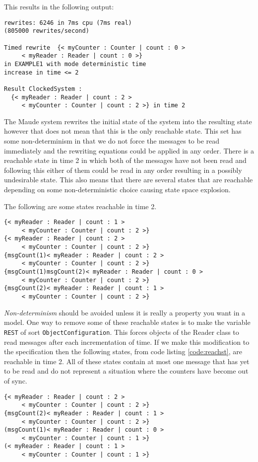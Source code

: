 This results in the following output:
\medskip
\begin{lstlisting}
rewrites: 6246 in 7ms cpu (7ms real) 
(805000 rewrites/second)

Timed rewrite  {< myCounter : Counter | count : 0 > 
     < myReader : Reader | count : 0 >} 
in EXAMPLE1 with mode deterministic time 
increase in time <= 2

Result ClockedSystem :
  {< myReader : Reader | count : 2 > 
     < myCounter : Counter | count : 2 >} in time 2
\end{lstlisting}

The Maude system rewrites the initial state of the system into the resulting state however that does not mean that this is the only reachable state. This set has some non-determinism in that we do not force the messages to be read immediately and the rewriting equations could be applied in any order. There is a reachable state in time 2 in which both of the messages have not been read and following this either of them could be read in any order resulting in a possibly undesirable state. This also means that there are several states that are reachable depending on some non-deterministic choice causing state space explosion.

The following are some states reachable in time 2.

\begin{lstlisting}[caption = Some of the states reachable by rewriting EXAMPLE1 in two time steps, label = code:reachst ]
{< myReader : Reader | count : 1 >
     < myCounter : Counter | count : 2 >}
{< myReader : Reader | count : 2 > 
     < myCounter : Counter | count : 2 >}
{msgCount(1)< myReader : Reader | count : 2 > 
     < myCounter : Counter | count : 2 >}
{msgCount(1)msgCount(2)< myReader : Reader | count : 0 >
     < myCounter : Counter | count : 2 >}
{msgCount(2)< myReader : Reader | count : 1 >
     < myCounter : Counter | count : 2 >}
\end{lstlisting}

\emph{Non-determinism} should be avoided unless it is really a property you want in a model. One way to remove some of these reachable states is to make the variable \texttt{REST} of sort \texttt{ObjectConfiguration}. This forces objects of the Reader class to read messages after each incrementation of time. If we make this modification to the specification then the following states, from code listing \ref{code:reachst}, are reachable in time 2. All of these states contain at most one message that has yet to be read and do not represent a situation where the counters have become out of sync.
\medskip
\begin{lstlisting}[caption = States reachable by the modified EXAMPLE1 in two time steps]
{< myReader : Reader | count : 2 > 
     < myCounter : Counter | count : 2 >}
{msgCount(2)< myReader : Reader | count : 1 > 
     < myCounter : Counter | count : 2 >}
(msgCount(1)< myReader : Reader | count : 0 > 
     < myCounter : Counter | count : 1 >}
(< myReader : Reader | count : 1 > 
     < myCounter : Counter | count : 1 >}
\end{lstlisting}


